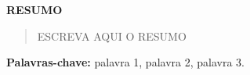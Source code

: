 % 
% 
% 
% 





\thispagestyle{empty}

\newenvironment{meuresumo}{
  \clearpage
  \small
  \vspace{-1cm}
  \begin{center}
    \bfseries RESUMO
    \vspace{0.5em}
  \end{center}
  \begin{quote}
}{
  \end{quote}
  \vspace{-1.1em}
  \begin{center}
  \begin{minipage}{0.87\textwidth} 
  \textbf{Palavras-chave:} palavra 1, palavra 2, palavra 3.
  \end{minipage}
  \end{center}
  \clearpage
}

\begin{meuresumo}
ESCREVA AQUI O RESUMO
\end{meuresumo}

\newpage





\thispagestyle{empty}

\newenvironment{meuabstract}{
  \clearpage
  \small
  \vspace{-1cm}
  \begin{center}
    \bfseries ABSTRACT
    \vspace{0.5em}
  \end{center}
  \begin{quote}
}{
  \end{quote}
  \vspace{-1.1em}
  \begin{center}
  \begin{minipage}{0.87\textwidth} 
  \textbf{keywords:} word 1, word 2, word 3.
  \end{minipage}
  \end{center}
  \clearpage
}

